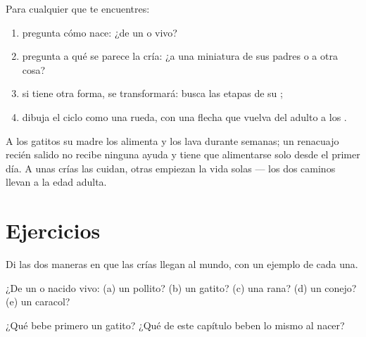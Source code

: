 \begin{method}\label{met:g2:animals-grow-up:read}
Para cualquier  que te encuentres:
\begin{enumerate}
  \item pregunta cómo nace: ¿de un  o vivo?
  \item pregunta a qué se parece la cría: ¿a una miniatura de sus
        padres o a otra cosa?
  \item si tiene otra forma, se transformará: busca las etapas de su
        ;
  \item dibuja el ciclo como una rueda, con una flecha que vuelva del
        adulto a los .
\end{enumerate}
\end{method}

\begin{remark}\label{rem:g2:animals-grow-up:care}
A los gatitos su madre los alimenta y los lava durante semanas; un
renacuajo recién salido no recibe ninguna ayuda y tiene que
alimentarse solo desde el primer día. A unas crías las cuidan, otras
empiezan la vida solas --- los dos caminos llevan a la edad adulta.
\end{remark}

\section{Ejercicios}

\begin{exercise}[$\star$]\label{exo:g2:animals-grow-up:1}
Di las dos maneras en que las crías llegan al mundo, con un ejemplo de
cada una.
\end{exercise}

\begin{exercise}[$\star$]\label{exo:g2:animals-grow-up:2}
¿De un  o nacido vivo: (a) un pollito? (b) un gatito? (c) una
rana? (d) un conejo? (e) un caracol?
\end{exercise}

\begin{exercise}[$\star$]\label{exo:g2:animals-grow-up:3}
¿Qué bebe primero un gatito? ¿Qué  de este capítulo beben lo
mismo al nacer?
\end{exercise}

